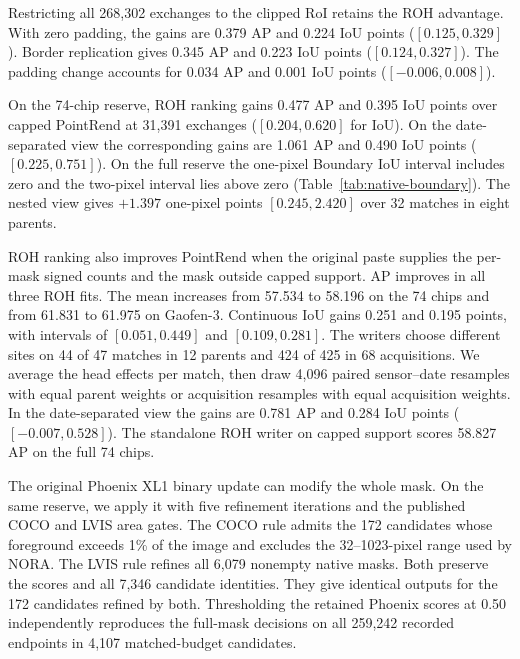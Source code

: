 \documentclass[journal]{IEEEtran}
\begin{document}
Restricting all 268,302 exchanges to the clipped RoI retains the ROH advantage. With zero padding, the gains are 0.379 AP and 0.224 IoU points (\([0.125,0.329]\)). Border replication gives 0.345 AP and 0.223 IoU points (\([0.124,0.327]\)). The padding change accounts for 0.034 AP and 0.001 IoU points (\([-0.006,0.008]\)).

On the 74-chip reserve, ROH ranking gains 0.477 AP and 0.395 IoU points over capped PointRend at 31,391 exchanges (\([0.204,0.620]\) for IoU). On the date-separated view the corresponding gains are 1.061 AP and 0.490 IoU points (\([0.225,0.751]\)). On the full reserve the one-pixel Boundary IoU interval includes zero and the two-pixel interval lies above zero (Table~\ref{tab:native-boundary}). The nested view gives \(+1.397\) one-pixel points \([0.245,2.420]\) over 32 matches in eight parents.

ROH ranking also improves PointRend when the original paste supplies the per-mask signed counts and the mask outside capped support. AP improves in all three ROH fits. The mean increases from 57.534 to 58.196 on the 74 chips and from 61.831 to 61.975 on Gaofen-3. Continuous IoU gains 0.251 and 0.195 points, with intervals of \([0.051,0.449]\) and \([0.109,0.281]\). The writers choose different sites on 44 of 47 matches in 12 parents and 424 of 425 in 68 acquisitions. We average the head effects per match, then draw 4,096 paired sensor--date resamples with equal parent weights or acquisition resamples with equal acquisition weights. In the date-separated view the gains are 0.781 AP and 0.284 IoU points (\([-0.007,0.528]\)). The standalone ROH writer on capped support scores 58.827 AP on the full 74 chips.

The original Phoenix XL1 binary update can modify the whole mask. On the same reserve, we apply it with five refinement iterations and the published COCO and LVIS area gates. The COCO rule admits the 172 candidates whose foreground exceeds 1\% of the image and excludes the 32--1023-pixel range used by NORA. The LVIS rule refines all 6,079 nonempty native masks. Both preserve the scores and all 7,346 candidate identities. They give identical outputs for the 172 candidates refined by both. Thresholding the retained Phoenix scores at 0.50 independently reproduces the full-mask decisions on all 259,242 recorded endpoints in 4,107 matched-budget candidates.
\end{document}
